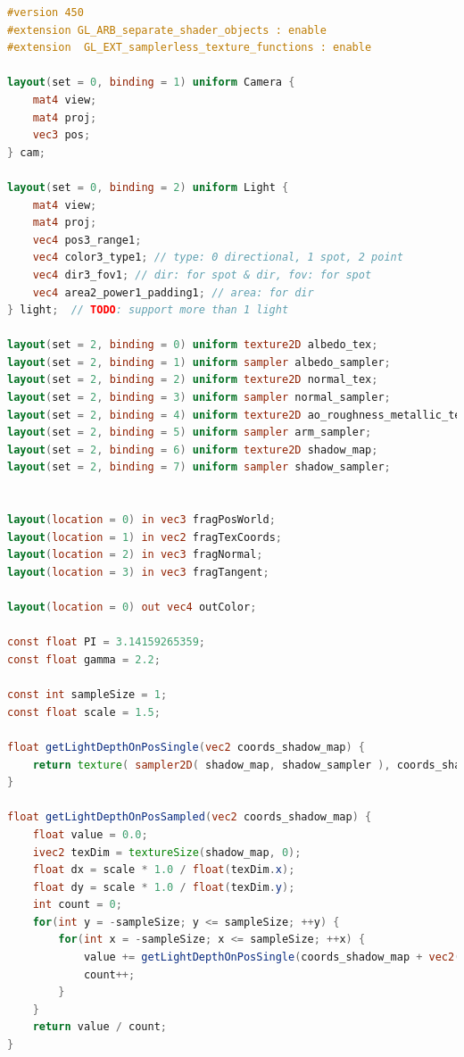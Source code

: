 \documentclass[oneside]{ausarbeitung}
\begin{document}
\begin{lstlisting}[language=glsl, label={lst:fragment_shader}, caption={Kompletter GLSL-Code des Fragment-Shaders der in der \textbf{spider}-Engine für das \ac{PBR} benutzt wird}]
#version 450
#extension GL_ARB_separate_shader_objects : enable
#extension  GL_EXT_samplerless_texture_functions : enable

layout(set = 0, binding = 1) uniform Camera {
    mat4 view;
    mat4 proj;
    vec3 pos;
} cam;

layout(set = 0, binding = 2) uniform Light {
    mat4 view;
    mat4 proj;
    vec4 pos3_range1;
    vec4 color3_type1; // type: 0 directional, 1 spot, 2 point
    vec4 dir3_fov1; // dir: for spot & dir, fov: for spot
    vec4 area2_power1_padding1; // area: for dir
} light;  // TODO: support more than 1 light

layout(set = 2, binding = 0) uniform texture2D albedo_tex;
layout(set = 2, binding = 1) uniform sampler albedo_sampler;
layout(set = 2, binding = 2) uniform texture2D normal_tex;
layout(set = 2, binding = 3) uniform sampler normal_sampler;
layout(set = 2, binding = 4) uniform texture2D ao_roughness_metallic_tex;
layout(set = 2, binding = 5) uniform sampler arm_sampler;
layout(set = 2, binding = 6) uniform texture2D shadow_map;
layout(set = 2, binding = 7) uniform sampler shadow_sampler;


layout(location = 0) in vec3 fragPosWorld;
layout(location = 1) in vec2 fragTexCoords;
layout(location = 2) in vec3 fragNormal;
layout(location = 3) in vec3 fragTangent;

layout(location = 0) out vec4 outColor;

const float PI = 3.14159265359;
const float gamma = 2.2;

const int sampleSize = 1;
const float scale = 1.5;

float getLightDepthOnPosSingle(vec2 coords_shadow_map) {
    return texture( sampler2D( shadow_map, shadow_sampler ), coords_shadow_map.xy ).r;
}

float getLightDepthOnPosSampled(vec2 coords_shadow_map) {
    float value = 0.0;
    ivec2 texDim = textureSize(shadow_map, 0);
    float dx = scale * 1.0 / float(texDim.x);
    float dy = scale * 1.0 / float(texDim.y);
    int count = 0;
    for(int y = -sampleSize; y <= sampleSize; ++y) {
        for(int x = -sampleSize; x <= sampleSize; ++x) {
            value += getLightDepthOnPosSingle(coords_shadow_map + vec2(x * dx, y * dy));
            count++;
        }
    }
    return value / count;
}


\end{lstlisting}
\end{document}
